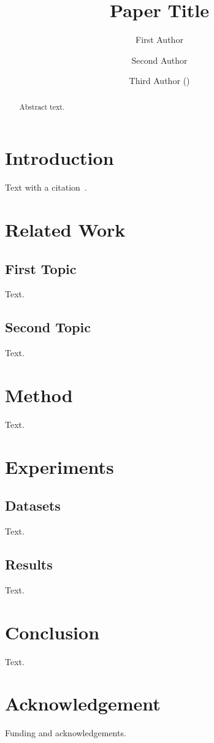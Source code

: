 \documentclass[runningheads]{llncs}
\newcommand\orcidicon[1]{\href{https://orcid.org/#1}{\usebox{\ORCIDlogo}}}
\begin{document}
\title{Paper Title}

\author{
First Author \orcidicon{0000-0000-0000-0000} \and
Second Author \orcidicon{0000-0000-0000-0000} \and
Third Author (\Letter) \orcidicon{0000-0000-0000-0000}
}



\maketitle

\begin{abstract}
Abstract text.

\end{abstract}

\section{Introduction}
Text with a citation~\cite{example}.

\section{Related Work}
\subsection{First Topic}
Text.

\subsection{Second Topic}
Text.

\section{Method}
Text.

\section{Experiments}
\subsection{Datasets}
Text.

\subsection{Results}
Text.

\section{Conclusion}
Text.

\section*{Acknowledgement}
Funding and acknowledgements.



\end{document}
